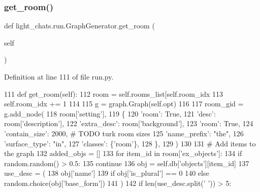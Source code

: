 \subsubsection{\texorpdfstring{get\+\_\+room()}{get\_room()}}
{\footnotesize\ttfamily def light\+\_\+chats.\+run.\+Graph\+Generator.\+get\+\_\+room (\begin{DoxyParamCaption}\item[{}]{self }\end{DoxyParamCaption})}



Definition at line 111 of file run.\+py.


\begin{DoxyCode}
111     \textcolor{keyword}{def }get\_room(self):
112         room = self.rooms\_list[self.room\_idx %
113         self.room\_idx += 1
114 
115         g = graph.Graph(self.opt)
116 
117         room\_gid = g.add\_node(
118             room[\textcolor{stringliteral}{'setting'}],
119             \{
120                 \textcolor{stringliteral}{'room'}: \textcolor{keyword}{True},
121                 \textcolor{stringliteral}{'desc'}: room[\textcolor{stringliteral}{'description'}],
122                 \textcolor{stringliteral}{'extra\_desc'}: room[\textcolor{stringliteral}{'background'}],
123                 \textcolor{stringliteral}{'room'}: \textcolor{keyword}{True},
124                 \textcolor{stringliteral}{'contain\_size'}: 2000,  \textcolor{comment}{# TODO turk room sizes}
125                 \textcolor{stringliteral}{'name\_prefix'}: \textcolor{stringliteral}{"the"},
126                 \textcolor{stringliteral}{'surface\_type'}: \textcolor{stringliteral}{"in"},
127                 \textcolor{stringliteral}{'classes'}: \{\textcolor{stringliteral}{'room'}\},
128             \},
129         )
130 
131         \textcolor{comment}{# Add items to the graph}
132         added\_objs = []
133         \textcolor{keywordflow}{for} item\_id \textcolor{keywordflow}{in} room[\textcolor{stringliteral}{'ex\_objects'}]:
134             \textcolor{keywordflow}{if} random.random() > 0.5:
135                 \textcolor{keywordflow}{continue}
136             obj = self.db[\textcolor{stringliteral}{'objects'}][item\_id]
137             use\_desc = (
138                 obj[\textcolor{stringliteral}{'name'}]
139                 \textcolor{keywordflow}{if} obj[\textcolor{stringliteral}{'is\_plural'}] == 0
140                 \textcolor{keywordflow}{else} random.choice(obj[\textcolor{stringliteral}{'base\_form'}])
141             )
142             \textcolor{keywordflow}{if} len(use\_desc.split(\textcolor{stringliteral}{' '})) > 5:

\end{DoxyCode}
